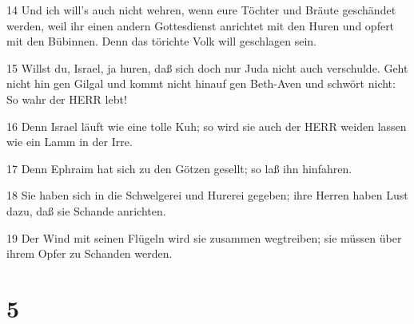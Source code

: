 \par 14 Und ich will's auch nicht wehren, wenn eure Töchter und Bräute geschändet werden, weil ihr einen andern Gottesdienst anrichtet mit den Huren und opfert mit den Bübinnen. Denn das törichte Volk will geschlagen sein.
\par 15 Willst du, Israel, ja huren, daß sich doch nur Juda nicht auch verschulde. Geht nicht hin gen Gilgal und kommt nicht hinauf gen Beth-Aven und schwört nicht: So wahr der HERR lebt!
\par 16 Denn Israel läuft wie eine tolle Kuh; so wird sie auch der HERR weiden lassen wie ein Lamm in der Irre.
\par 17 Denn Ephraim hat sich zu den Götzen gesellt; so laß ihn hinfahren.
\par 18 Sie haben sich in die Schwelgerei und Hurerei gegeben; ihre Herren haben Lust dazu, daß sie Schande anrichten.
\par 19 Der Wind mit seinen Flügeln wird sie zusammen wegtreiben; sie müssen über ihrem Opfer zu Schanden werden.

\chapter{5}

